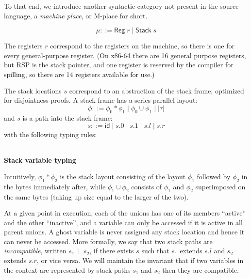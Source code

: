 \documentclass[acmsmall,nonacm]{acmart}
\newcommand{\proves}{\vdash}
\newcommand{\judgment}[2][]{\noindent\\\textbf{#1}\hspace{\stretch{1}}\fbox{$#2$}\nopagebreak}
\newcommand*{\axiom}[2][]{\infer[#1]{}{#2}}
\begin{document}
To that end, we introduce another syntactic category not present in the source language, a \emph{machine place}, or M-place for short.

$$\mu::=\mathsf{Reg}\;r\mid \mathsf{Stack}\;s$$

The registers $r$ correspond to the registers on the machine, so there is one for every general-purpose register. (On x86-64 there are 16 general purpose registers, but RSP is the stack pointer, and one register is reserved by the compiler for spilling, so there are 14 registers available for use.)

The stack locations $s$ correspond to an abstraction of the stack frame, optimized for disjointness proofs. A stack frame has a series-parallel layout:
$$\phi ::= \phi_0\ast\phi_1\mid \phi_0\cup \phi_1\mid |\tau|$$
and $s$ is a path into the stack frame:
$$s ::= \mathsf{id}\mid s.0\mid s.1 \mid s.l \mid s.r$$
with the following typing rules:

\judgment[Stack variable typing]{\phi\proves s:\phi'}

Intuitively, $\phi_1\ast\phi_2$ is the stack layout consisting of the layout $\phi_1$ followed by $\phi_2$ in the bytes immediately after, while $\phi_1\cup\phi_2$ consists of $\phi_1$ and $\phi_2$ superimposed on the same bytes (taking up size equal to the larger of the two).

At a given point in execution, each of the unions has one of its members ``active'' and the other ``inactive'', and a variable can only be accessed if it is active in all parent unions.
A ghost variable is never assigned any stack location and hence it can never be accessed. More formally, we say that two stack paths are \emph{incompatible}, written $s_1\perp s_2$, if there exists $s$ such that $s_1$ extends $s.l$ and $s_2$ extends $s.r$, or vice versa. We will maintain the invariant that if two variables in the context are represented by stack paths $s_1$ and $s_2$ then they are compatible.
\end{document}
